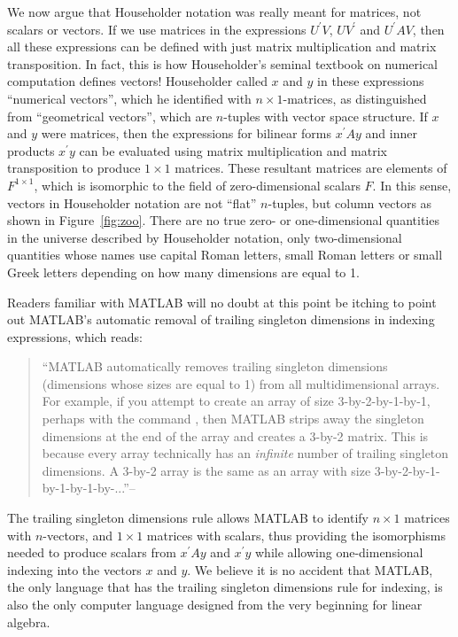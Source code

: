 We now argue that Householder notation was really meant for matrices, not scalars or vectors. If we use matrices in the expressions $U^\prime V$, $U V^\prime$ and $U^\prime A V$, then all these expressions can be defined with just matrix multiplication and matrix transposition. In fact, this is how Householder's seminal textbook on numerical computation defines vectors!\cite{Householder1955} Householder called $x$ and $y$ in these expressions ``numerical vectors'', which he identified with $n\times1$-matrices, as distinguished from
``geometrical vectors'', which are $n$-tuples with vector space structure.
If $x$ and $y$ were matrices, then the expressions for bilinear forms $x^\prime A y$ and inner products $x^\prime y$ can be evaluated using matrix multiplication and matrix transposition to produce $1\times1$ matrices. These resultant matrices are elements of $F^{1\times1}$, which is isomorphic to the field of zero-dimensional scalars $F$. In this sense, vectors in Householder notation are not ``flat'' $n$-tuples, but column vectors as shown in Figure~\ref{fig:zoo}. There are no true zero- or one-dimensional quantities in the universe described by Householder notation, only two-dimensional quantities whose names use capital Roman letters, small Roman letters or small Greek letters depending on how many dimensions are equal to 1.

Readers familiar with MATLAB will no doubt at this point be itching to point out MATLAB's automatic removal of trailing singleton dimensions in indexing expressions, which reads:

\begin{quote}
``MATLAB automatically removes trailing singleton dimensions (dimensions whose sizes are equal to 1) from all multidimensional arrays. For example, if you attempt to create an array of size 3-by-2-by-1-by-1, perhaps with the command , then MATLAB strips away the singleton dimensions at the end of the array and creates a 3-by-2 matrix. This is because every array technically has an \textit{infinite} number of trailing singleton dimensions. A 3-by-2 array is the same as an array with size 3-by-2-by-1-by-1-by-1-by-...''--\cite{matlab.singleton}
\end{quote}

The trailing singleton dimensions rule allows MATLAB to identify $n\times1$ matrices with $n$-vectors, and $1\times1$ matrices with scalars, thus providing  the isomorphisms needed to produce scalars from $x^\prime A y$ and $x^\prime y$ while allowing one-dimensional indexing into the vectors $x$ and $y$. We believe it is no accident that MATLAB, the only language that has the trailing singleton dimensions rule for indexing, is also the only computer language designed from the very beginning for linear algebra.~\cite{Moler1980}

